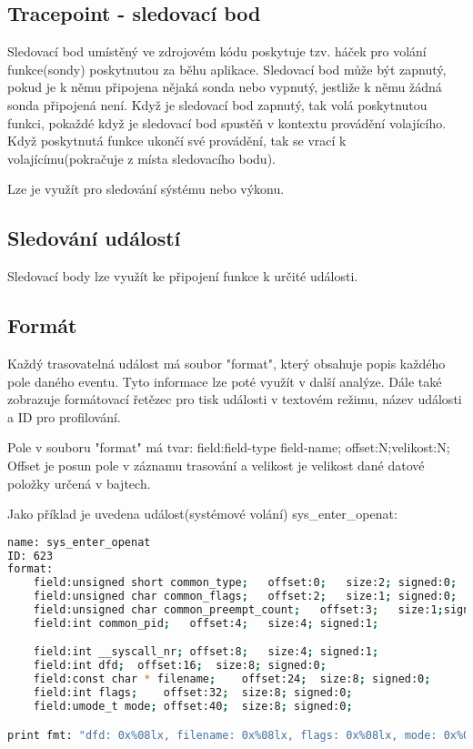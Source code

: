 \iffalse
www.linfo.org/kernel_space.html
\fi

\subsection{Tracepoint - sledovací bod}
Sledovací bod umístěný ve zdrojovém kódu poskytuje tzv. háček pro volání funkce(sondy) poskytnutou za běhu aplikace. Sledovací bod může
být zapnutý, pokud je k němu připojena nějaká sonda nebo vypnutý, jestliže k němu žádná sonda připojená není. Když je sledovací bod
zapnutý, tak volá poskytnutou funkci, pokaždé když je sledovací bod spustěň v kontextu provádění volajícího. Když poskytnutá funkce
ukončí své provádění, tak se vrací k volajícímu(pokračuje z místa sledovacího bodu).

Lze je využít pro sledování sýstému nebo výkonu.

\iffalse
https://www.kernel.org/doc/Documentation/trace/tracepoints.rst
\fi

\subsection {Sledování událostí}
Sledovací body lze využít ke připojení funkce k určité události.

\subsection*{Formát}
Každý trasovatelná událost má soubor "format", který obsahuje popis každého pole daného eventu. Tyto informace lze poté využít v další
analýze. Dále také zobrazuje formátovací řetězec pro tisk události v textovém režimu, název události a ID pro profilování.

Pole v souboru "format" má tvar:
field:field-type field-name; offset:N;velikost:N;
Offset je posun pole v záznamu trasování a velikost je velikost dané datové položky určená v bajtech.

Jako příklad je uvedena událost(systémové volání) sys_enter_openat:
\begin{lstlisting}[language=bash]
name: sys_enter_openat
ID: 623
format:
	field:unsigned short common_type;	offset:0;	size:2;	signed:0;
	field:unsigned char common_flags;	offset:2;	size:1;	signed:0;
	field:unsigned char common_preempt_count;	offset:3;	size:1;signed:0;
	field:int common_pid;	offset:4;	size:4;	signed:1;

	field:int __syscall_nr;	offset:8;	size:4;	signed:1;
	field:int dfd;	offset:16;	size:8;	signed:0;
	field:const char * filename;	offset:24;	size:8;	signed:0;
	field:int flags;	offset:32;	size:8;	signed:0;
	field:umode_t mode;	offset:40;	size:8;	signed:0;

print fmt: "dfd: 0x%08lx, filename: 0x%08lx, flags: 0x%08lx, mode: 0x%08lx", ((unsigned long)(REC->dfd)), ((unsigned long)(REC->filename)), ((unsigned long)(REC->flags)), ((unsigned long)(REC->mode))
\end{lstlisting}

